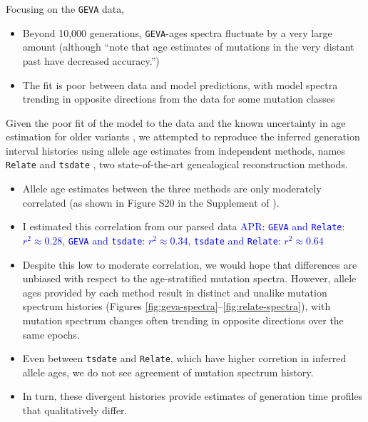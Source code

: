 \documentclass[]{article}
\newcommand{\aprcomment}[1]{{\textcolor{blue}{APR: #1}}}
\newcommand{\GEVA}{\texttt{GEVA}\xspace}
\newcommand{\tsdate}{\texttt{tsdate}\xspace}
\newcommand{\relate}{\texttt{Relate}\xspace}
\begin{document}
Focusing on the \GEVA data,
\begin{itemize}
    \item Beyond 10,000 generations, \GEVA-ages spectra fluctuate by a
        very large amount (although \citet{wang2023human} ``note that age
        estimates of mutations in the very distant past have decreased
        accuracy.'')
    \item The fit is poor between data and model predictions, with model
        spectra trending in opposite directions from the data for some
        mutation classes \citep{gao2022limited}
\end{itemize}

Given the poor fit of the model to the data and the known uncertainty in age
estimation for older variants \citep{albers2020dating}, we attempted to
reproduce the inferred generation interval histories using allele age estimates
from independent methods, names \relate \citep{speidel2019method} and \tsdate
\citep{wohns2022unified}, two state-of-the-art genealogical reconstruction
methods.
\begin{itemize}
    \item Allele age estimates between the three methods are only moderately
        correlated (as shown in Figure S20 in the Supplement of
        \citet{wohns2022unified}).
    \item I estimated this correlation from our parsed data
        \aprcomment{
            \GEVA and \relate: $r^2 \approx 0.28$,
            \GEVA and \tsdate: $r^2 \approx 0.34$,
            \tsdate and \relate: $r^2 \approx 0.64$
        }
    \item Despite this low to moderate correlation, 
        we would hope that differences are
        unbiased with respect to the age-stratified mutation spectra. However,
        allele ages provided by each method result in distinct and
        unalike mutation spectrum histories (Figures
        \ref{fig:geva-spectra}--\ref{fig:relate-spectra}), with mutation
        spectrum changes often trending in opposite directions over the same
        epochs.
    \item Even between \tsdate and \relate, which have higher corretion in
        inferred allele ages, we do not see agreement of mutation spectrum
        history.
    \item In turn, these divergent histories provide estimates of
        generation time profiles that qualitatively differ.
\end{itemize}
\end{document}
